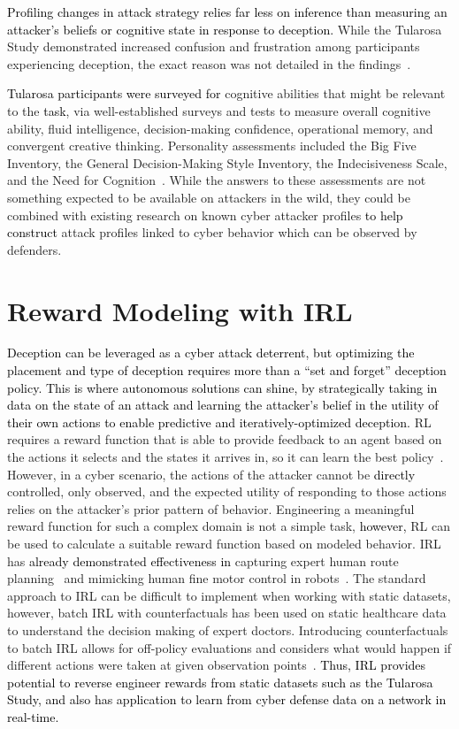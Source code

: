 \documentclass{article}
\newcommand\kjf[1]{\textcolor{black}{#1}}
\newcommand\nnn[1]{\textcolor{black}{#1}}
\begin{document}
\nnn{Profiling changes in attack strategy relies far less on inference than measuring an attacker's beliefs or cognitive state in response to deception.} 
While the Tularosa Study demonstrated increased confusion and frustration among participants experiencing deception, the exact reason was not detailed in the findings~\cite{tularosa2019}. 

\nnn{Tularosa participants were surveyed for} cognitive abilities that might be relevant to the \kjf{task}, via well-established surveys and tests to measure overall cognitive ability, fluid intelligence, decision-making confidence, operational memory, and convergent creative thinking. Personality assessments included the Big Five Inventory, the General Decision-Making Style Inventory, the Indecisiveness Scale, and the Need for Cognition~\cite{tularosa2019}. While the answers to these assessments are not something expected to be available on attackers in the wild, they could be combined with existing research on known cyber attacker profiles \nnn{to help construct} attack profiles linked to cyber behavior which can be observed by defenders. 

\section{Reward Modeling with IRL}\label{sub:irl}

\nnn{Deception can be leveraged as a cyber attack deterrent, but optimizing the placement and type of deception requires more than a ``set and forget'' deception policy. This is where autonomous solutions can shine, by strategically taking in data on the state of an attack and learning the attacker's belief in the utility of their own actions to enable predictive and iteratively-optimized deception.}
RL requires a reward function that is able to provide feedback to an agent based on the actions it selects and the states it arrives in, so it can learn the best policy~\cite{sutton_reinforcement_2017}. However, in a cyber scenario, the actions of the attacker cannot be \kjf{directly} controlled, only observed, and the expected utility of responding to those actions relies on the attacker's prior pattern of behavior. Engineering a meaningful reward function for such a complex domain is not a simple task, \nnn{however,} RL can be used to calculate a suitable reward function based on modeled behavior. IRL has \nnn{already demonstrated effectiveness in} capturing expert human route planning~\cite{ziebart2008} and mimicking human fine motor control in robots~\cite{finn2016}. The standard approach to IRL can be difficult to implement when working with static datasets, however, batch IRL with counterfactuals has been used on static healthcare data to understand the decision making of expert doctors. Introducing counterfactuals to batch IRL allows for off-policy evaluations and considers what would happen if different actions were taken at given observation points~\cite{bica2021}. \nnn{Thus, IRL provides potential to reverse engineer rewards from static datasets such as the Tularosa Study, and also has application to learn from cyber defense data on a network in real-time.} 
\end{document}
